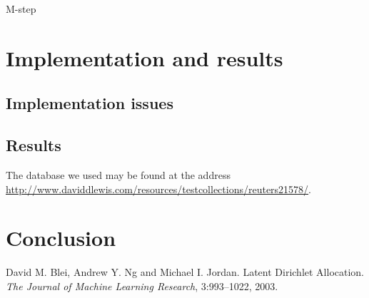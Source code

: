 \documentclass{article}
\begin{document}
\begin{algorithm}
\caption{M-step}
\end{algorithm}

\section{Implementation and results}
\subsection{Implementation issues}

\subsection{Results}

The database we used may be found at the address \url{http://www.daviddlewis.com/resources/testcollections/reuters21578/}.

\section{Conclusion}

\begin{thebibliography}{BNJ03}
 David M. Blei, Andrew Y. Ng and Michael I. Jordan. Latent Dirichlet Allocation. \emph{The Journal of Machine Learning Research}, 3:993--1022, 2003.
\end{thebibliography}
\end{document}
